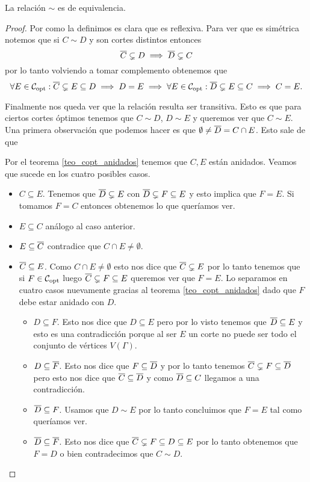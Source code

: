 \documentclass[tesis.tex]{subfiles}
\begin{document}
\begin{prop}
	La relación $\sim$ es de equivalencia.
\end{prop}
\begin{proof}
	Por como la definimos es clara que es reflexiva.
	Para ver que es simétrica notemos que si $C \sim D$ y son cortes distintos entonces  
	\[
		\overline C \subsetneq D \implies \overline D \subsetneq C
	\]
	por lo tanto volviendo a tomar complemento obtenemos que
	\[
	\forall E \in {\cal C}_{\text{opt}} : \overline C \subsetneq E \subseteq D \implies D = E \implies \forall E \in {\cal C}_{\text{opt}} : \overline D \subsetneq E \subseteq C \implies C = E.
	\]
	
	Finalmente nos queda ver que la relación resulta ser transitiva.
	Esto es que para ciertos cortes óptimos tenemos que $C \sim D$, $D \sim E$ y queremos ver que $C \sim E$.
	Una primera observación que podemos hacer es que $\emptyset \neq \overline D = C \cap E$.
	Esto sale de que  
	
	Por el teorema \ref{teo_copt_anidados} tenemos que $C,E$ están anidados.
	Veamos que sucede en los cuatro posibles casos.
	\begin{itemize}
		\item $C \subseteq E$. 
		Tenemos que $\overline D \subsetneq E$ con $\overline D \subsetneq F \subseteq E$ y esto implica que $F=E$.
		Si tomamos $F = C$ entonces obtenemos lo que queríamos ver.
		\item $E \subseteq C$ análogo al caso anterior.
		\item $E \subseteq \overline C$ contradice que $C \cap E \neq \emptyset$.
		\item $\overline C \subseteq E$.
		Como $C \cap E \neq \emptyset$ esto nos dice que $\overline C \subsetneq E$ por lo tanto tenemos que si $F \in {\cal C}_{\text{opt}}$ luego	$\overline C \subsetneq F \subseteq E$ queremos ver que $F=E$.
		Lo separamos en cuatro casos nuevamente gracias al teorema \ref{teo_copt_anidados} dado que $F$ debe estar anidado con $D$.
		\begin{itemize}
			\item $D \subseteq F$.
			Esto nos dice que $D \subseteq E$ pero por lo visto tenemos que $\overline D \subseteq E$ y esto es una contradicción porque al ser $E$ un corte no puede ser todo el conjunto de vértices $V(\Gamma)$.
			\item $D \subseteq \overline F$. 
			Esto nos dice que $F \subseteq \overline D$ y por lo tanto tenemos $\overline C \subsetneq F \subseteq \overline D$ pero esto nos dice que $\overline C \subseteq \overline D$ y como $\overline D \subseteq C$ llegamos a una contradicción.
			\item $\overline D \subseteq F$.
			Usamos que $D \sim E$ por lo tanto concluimos que $F=E$ tal como queríamos ver.			
			\item $\overline D \subseteq \overline F$.
			Esto nos dice que $\overline C \subsetneq F \subseteq D \subseteq E$ por lo tanto obtenemos que $F = D$ o bien contradecimos que $C \sim D$.
		\end{itemize}
	\end{itemize}
\end{proof}
\end{document}
